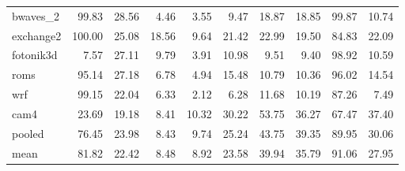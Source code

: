 \documentclass[10pt,a4paper]{article}
\begin{document}
{\begin{longtable}{@{}lrrrrrrrrr@{}}
bwaves\_2 & 99.83 & 28.56 & 4.46 & 3.55 & 9.47 & 18.87 & 18.85 & 99.87 & 10.74 \\
exchange2 & 100.00 & 25.08 & 18.56 & 9.64 & 21.42 & 22.99 & 19.50 & 84.83 & 22.09 \\
fotonik3d & 7.57 & 27.11 & 9.79 & 3.91 & 10.98 & 9.51 & 9.40 & 98.92 & 10.59 \\
roms & 95.14 & 27.18 & 6.78 & 4.94 & 15.48 & 10.79 & 10.36 & 96.02 & 14.54 \\
wrf & 99.15 & 22.04 & 6.33 & 2.12 & 6.28 & 11.68 & 10.19 & 87.26 & 7.49 \\
cam4 & 23.69 & 19.18 & 8.41 & 10.32 & 30.22 & 53.75 & 36.27 & 67.47 & 37.40 \\
\midrule
pooled & 76.45 & 23.98 & 8.43 & 9.74 & 25.24 & 43.75 & 39.35 & 89.95 & 30.06 \\
mean & 81.82 & 22.42 & 8.48 & 8.92 & 23.58 & 39.94 & 35.79 & 91.06 & 27.95 \\
\end{longtable}
}
\end{document}
